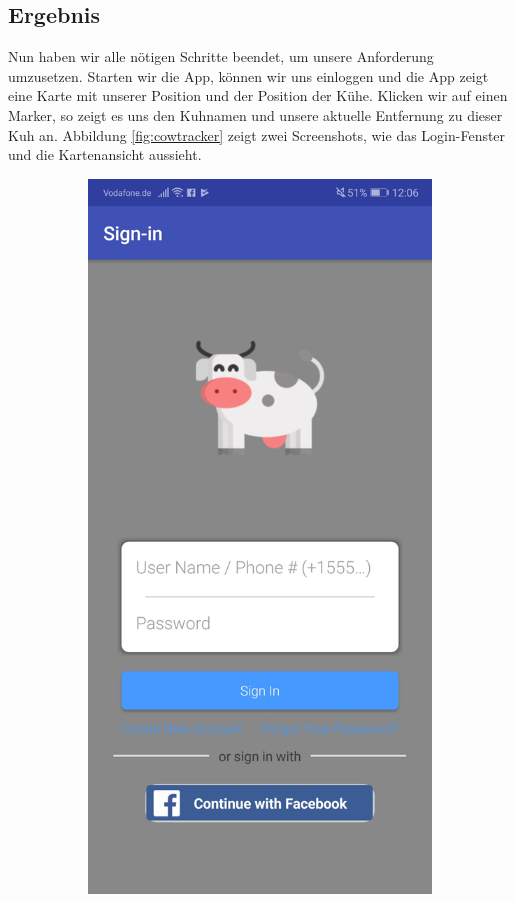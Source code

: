 \subsection{Ergebnis}
Nun haben wir alle nötigen Schritte beendet, um unsere Anforderung umzusetzen. Starten wir die App, können wir uns einloggen und die App zeigt eine Karte mit unserer Position und der Position der Kühe. Klicken wir auf einen Marker, so zeigt es uns den Kuhnamen und unsere aktuelle Entfernung zu dieser Kuh an. Abbildung \ref{fig:cowtracker} zeigt zwei Screenshots, wie das Login-Fenster und die Kartenansicht aussieht. 
\begin{figure}[!ht]
	\centering
	\begin{subfigure}{0.49\linewidth}
		\includegraphics[width=1\linewidth]{Pictures/Screenshot_Login.jpg}

\end{subfigure}
\end{figure}

